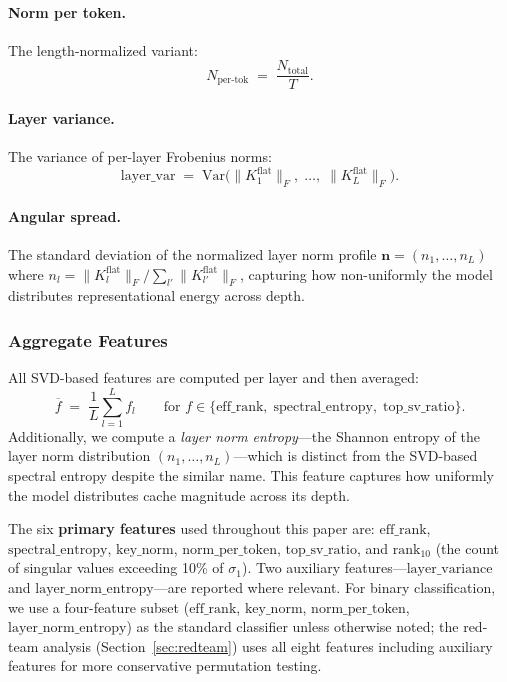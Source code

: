 \paragraph{Norm per token.}
The length-normalized variant:
\begin{equation}
  N_{\mathrm{per\text{-}tok}} \;=\; \frac{N_{\mathrm{total}}}{T}.
  \label{eq:norm-per-token}
\end{equation}

\paragraph{Layer variance.}
The variance of per-layer Frobenius norms:
\begin{equation}
  \mathrm{layer\_var} \;=\; \mathrm{Var}\!\bigl(\lVert K_1^{\mathrm{flat}} \rVert_F,\;\ldots,\;\lVert K_L^{\mathrm{flat}} \rVert_F\bigr).
  \label{eq:layer-var}
\end{equation}

\paragraph{Angular spread.}
The standard deviation of the normalized layer norm profile $\mathbf{n} = (n_1, \ldots, n_L)$ where $n_l = \lVert K_l^{\mathrm{flat}} \rVert_F / \sum_{l'} \lVert K_{l'}^{\mathrm{flat}} \rVert_F$, capturing how non-uniformly the model distributes representational energy across depth.

\subsubsection{Aggregate Features}

All SVD-based features are computed per layer and then averaged:
\begin{equation}
  \overline{f} \;=\; \frac{1}{L} \sum_{l=1}^{L} f_l \qquad \text{for } f \in \{\mathrm{eff\_rank},\;\mathrm{spectral\_entropy},\;\mathrm{top\_sv\_ratio}\}.
  \label{eq:aggregate}
\end{equation}
Additionally, we compute a \emph{layer norm entropy}---the Shannon entropy of the layer norm distribution $(n_1, \ldots, n_L)$---which is distinct from the SVD-based spectral entropy despite the similar name.
This feature captures how uniformly the model distributes cache magnitude across its depth.

The six \textbf{primary features} used throughout this paper are: $\mathrm{eff\_rank}$, $\mathrm{spectral\_entropy}$, $\mathrm{key\_norm}$, $\mathrm{norm\_per\_token}$, $\mathrm{top\_sv\_ratio}$, and $\mathrm{rank}_{10}$ (the count of singular values exceeding 10\% of $\sigma_1$).
Two auxiliary features---$\mathrm{layer\_variance}$ and $\mathrm{layer\_norm\_entropy}$---are reported where relevant.
For binary classification, we use a four-feature subset ($\mathrm{eff\_rank}$, $\mathrm{key\_norm}$, $\mathrm{norm\_per\_token}$, $\mathrm{layer\_norm\_entropy}$) as the standard classifier unless otherwise noted; the red-team analysis (Section~\ref{sec:redteam}) uses all eight features including auxiliary features for more conservative permutation testing.

